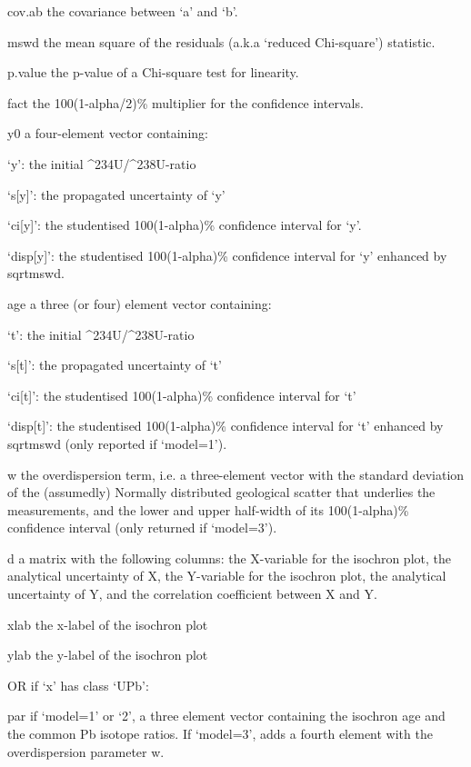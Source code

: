      cov.ab the covariance between ‘a’ and ‘b’.

     mswd the mean square of the residuals (a.k.a `reduced Chi-square')
          statistic.

     p.value the p-value of a Chi-square test for linearity.

     fact the 100(1-alpha/2)\% multiplier for the confidence intervals.

     y0 a four-element vector containing:

          ‘y’: the initial ^{234}U/^{238}U-ratio

          ‘s[y]’: the propagated uncertainty of ‘y’

          ‘ci[y]’: the studentised 100(1-alpha)\% confidence interval
          for ‘y’.

          ‘disp[y]’: the studentised 100(1-alpha)\% confidence interval
          for ‘y’ enhanced by sqrt{mswd}.

     age a three (or four) element vector containing:

          ‘t’: the initial ^{234}U/^{238}U-ratio

          ‘s[t]’: the propagated uncertainty of ‘t’

          ‘ci[t]’: the studentised 100(1-alpha)\% confidence interval
          for ‘t’

          ‘disp[t]’: the studentised 100(1-alpha)\% confidence interval
          for ‘t’ enhanced by sqrt{mswd} (only reported if ‘model=1’).

     w the overdispersion term, i.e. a three-element vector with the
          standard deviation of the (assumedly) Normally distributed
          geological scatter that underlies the measurements, and the
          lower and upper half-width of its 100(1-alpha)\% confidence
          interval (only returned if ‘model=3’).

     d a matrix with the following columns: the X-variable for the
          isochron plot, the analytical uncertainty of X, the
          Y-variable for the isochron plot, the analytical uncertainty
          of Y, and the correlation coefficient between X and Y.

     xlab the x-label of the isochron plot

     ylab the y-label of the isochron plot

     OR if ‘x’ has class ‘UPb’:

     par if ‘model=1’ or ‘2’, a three element vector containing the
          isochron age and the common Pb isotope ratios. If ‘model=3’,
          adds a fourth element with the overdispersion parameter w.

